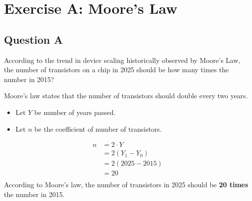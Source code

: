\documentclass[12pt]{article}
\newenvironment{sol}[1][Solution]{\begin{trivlist}
		\item[\hskip \labelsep {\bfseries {#1}:}]}{\end{trivlist}}
\newcommand{\Let}[2]{Let {$#1$} be #2.}
\begin{document}
\title{\doctitle}
\author{\ponename}
\date{\today}
\maketitle
\thispagestyle{empty} %


\newpage
\setcounter{page}{1}

\bigskip

\section*{Exercise A: Moore's Law}
\subsection*{Question A}
According to the trend in device scaling historically observed by Moore’s Law, the number of transistors on a chip in 2025 should be how many times the number in 2015?
\begin{sol}
	Moore's law states that the number of transistors should double every two years.
	\begin{itemize}
		\item \Let{Y}{number of years passed}
		\item \Let{n}{the coefficient of number of transistors}
	\end{itemize}
	\begin{align*}
		n & = 2\cdot{Y}    \\
		  & = 2(Y_1-Y_0)   \\
		  & = 2(2025-2015) \\
		  & = 20           \\
	\end{align*}
	According to Moore's law, the number of transistors in 2025 should be \textbf{20 times} the number in 2015.
\end{sol}


\end{document}
